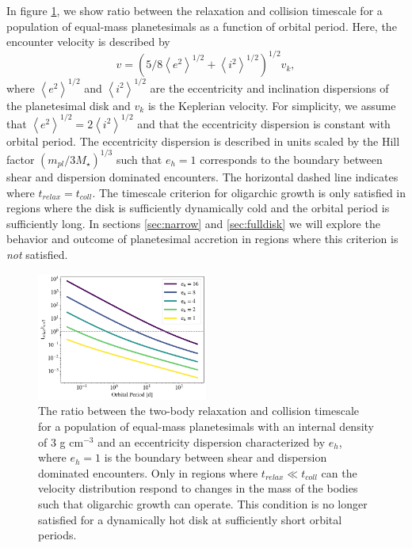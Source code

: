 \documentclass[twocolumn]{aastex63}
\begin{document}
In figure \ref{fig:timescales}, we show ratio between the relaxation
and collision timescale for a population of equal-mass planetesimals
as a function of orbital period. Here, the encounter velocity is
described by
$$
v = \left( 5/8 \left< e^2 \right>^{1/2} + \left< i^2 \right>^{1/2}
\right)^{1/2} v_{k},
$$
\citep{lissauer93} where $\left< e^2 \right>^{1/2}$ and $\left< i^2
\right>^{1/2}$ are the eccentricity and inclination dispersions of the
planetesimal disk and $v_{k}$ is the Keplerian velocity. For
simplicity, we assume that $\left< e^2 \right>^{1/2} = 2\left< i^2
\right>^{1/2}$ \citep{ida93a} and that the eccentricity dispersion is
constant with orbital period. The eccentricity dispersion is described
in units scaled by the Hill factor $\left( m_{pl}/ 3 M_{\star}
\right)^{1/3}$ such that $e_{h} = 1$ corresponds to the boundary
between shear and dispersion dominated encounters. The horizontal
dashed line indicates where $t_{relax} = t_{coll}$. The timescale
criterion for oligarchic growth is only satisfied in regions where the
disk is sufficiently dynamically cold and the orbital period is
sufficiently long. In sections \ref{sec:narrow} and \ref{sec:fulldisk}
we will explore the behavior and outcome of planetesimal accretion in regions where this criterion is \textit{not} satisfied. 

\begin{figure}
\begin{center}
    \includegraphics[width=0.5\textwidth]{figures/timescales.png}
    \caption{The ratio between the two-body relaxation and collision
      timescale for a population of equal-mass planetesimals with an
      internal density of 3 g cm$^{-3}$ and an eccentricity dispersion
      characterized by $e_h$, where $e_h = 1$ is the boundary between
      shear and dispersion dominated encounters. Only in regions where $t_{relax} \ll t_{coll}$ can the velocity distribution respond to changes in the mass of the bodies such that oligarchic growth can operate. This condition is no longer satisfied for a dynamically hot disk at sufficiently short orbital periods.\label{fig:timescales}}
\end{center}
\end{figure}
\end{document}
